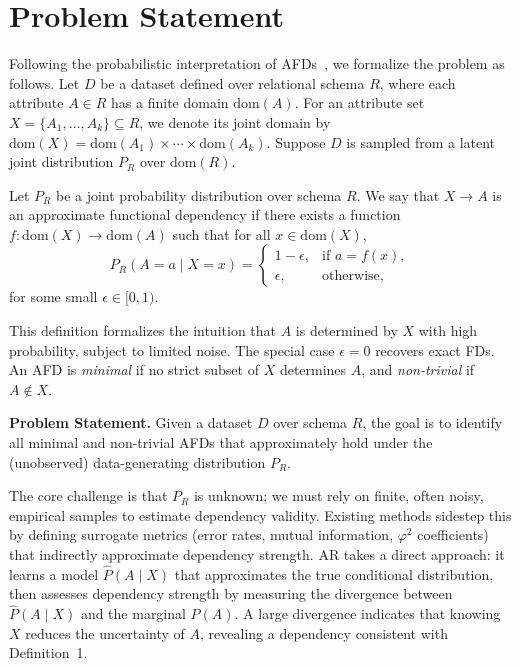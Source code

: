 \documentclass[conference]{IEEEtran}
\begin{document}
\section{Problem Statement}\label{sec:problem}

Following the probabilistic interpretation of AFDs~\cite{pyro,measure_study}, we formalize the problem as follows. Let $D$ be a dataset defined over relational schema $R$, where each attribute $A \in R$ has a finite domain $\text{dom}(A)$. For an attribute set $X = \{A_1, \ldots, A_k\} \subseteq R$, we denote its joint domain by $\text{dom}(X) = \text{dom}(A_1) \times \cdots \times \text{dom}(A_k)$. Suppose $D$ is sampled from a latent joint distribution $P_R$ over $\text{dom}(R)$.

\begin{definition}
Let $P_R$ be a joint probability distribution over schema $R$. We say that $X \to A$ is an approximate functional dependency if there exists a function $f: \text{dom}(X) \to \text{dom}(A)$ such that for all $x \in \text{dom}(X)$,
\begin{equation}
    P_R(A = a \mid X = x) = \begin{cases} 1 - \epsilon, & \text{if } a = f(x), \\ \epsilon, & \text{otherwise}, \end{cases}
\end{equation}
for some small $\epsilon \in [0, 1)$.
\end{definition}

This definition formalizes the intuition that $A$ is determined by $X$ with high probability, subject to limited noise. The special case $\epsilon = 0$ recovers exact FDs. An AFD is \textit{minimal} if no strict subset of $X$ determines $A$, and \textit{non-trivial} if $A \notin X$.

\textbf{Problem Statement.} Given a dataset $D$ over schema $R$, the goal is to identify all minimal and non-trivial AFDs that approximately hold under the (unobserved) data-generating distribution $P_R$.

The core challenge is that $P_R$ is unknown; we must rely on finite, often noisy, empirical samples to estimate dependency validity. Existing methods sidestep this by defining surrogate metrics (error rates, mutual information, $\varphi^2$ coefficients) that indirectly approximate dependency strength. AR takes a direct approach: it learns a model $\hat{P}(A \mid X)$ that approximates the true conditional distribution, then assesses dependency strength by measuring the divergence between $\hat{P}(A \mid X)$ and the marginal $P(A)$. A large divergence indicates that knowing $X$ reduces the uncertainty of $A$, revealing a dependency consistent with Definition~1.
\end{document}
